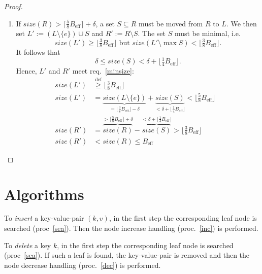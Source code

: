 \documentclass{vldb}
\newcommand \Beff { B_{\text{eff}} }
\begin{document}
\begin{proof}
\begin{enumerate}
\item
If \mbox{$size(R) > \lceil \frac{5}{8} \Beff \rceil + \delta$}, a set
\mbox{$S \subseteq R$} must be moved from $R$ to $L$.
We then set \mbox{$L' := (L \setminus \{e\}) \cup S$} and
\mbox{$R' := R \setminus S$}.
The set $S$ must be minimal, i.e.
\[ size(L') \geq \lfloor \tfrac{3}{8} \Beff \rfloor \text{ but }
    size(L' \setminus \max S) < \lfloor \tfrac{3}{8} \Beff \rfloor. \]
It follows that
\[ \delta \leq size(S) < \delta + \lfloor \tfrac{1}{4} \Beff \rfloor. \]
Hence, $L'$ and $R'$ meet req.~\ref{minsize}:
\begin{align*}
size(L')
    &\stackrel{\mathrm{def}}{\geq} \lfloor \tfrac{3}{8} \Beff \rfloor\\
size(L')
    &= \underbrace{size(L \setminus \{e\})}_{
            = \lfloor \frac{3}{8} \Beff \rfloor - \delta}
        + \underbrace{size(S)}_{
            < \delta + \lfloor \frac{1}{4} \Beff \rfloor}
    < \lfloor \tfrac{5}{8} \Beff \rfloor\\
size(R')
    &= \overbrace{size(R)}^{
            > \lceil \frac{5}{8} \Beff \rceil + \delta}
        - \overbrace{size(S)}^{
            < \delta + \lfloor \frac{1}{4} \Beff \rfloor}
    > \lfloor \tfrac{3}{8} \Beff \rfloor\\
size(R')
    &< size(R) \leq \Beff                                     &
\end{align*}
\end{enumerate}
\end{proof}



\section{Algorithms} %

\begin{proc} \label{ins}
To {\em insert} a key-value-pair \mbox{$(k, v)$}, in the first step the
corresponding leaf node is searched (proc~\ref{sea}).
Then the node increase handling (proc.~\ref{inc}) is performed.
\end{proc}


\begin{proc} \label{del}
To {\em delete} a key $k$, in the first step the corresponding
leaf node is searched (proc~\ref{sea}).
If such a leaf is found, the key-value-pair is removed and then the node
decrease handling (proc.~\ref{dec}) is performed.
\end{proc}
\end{document}
